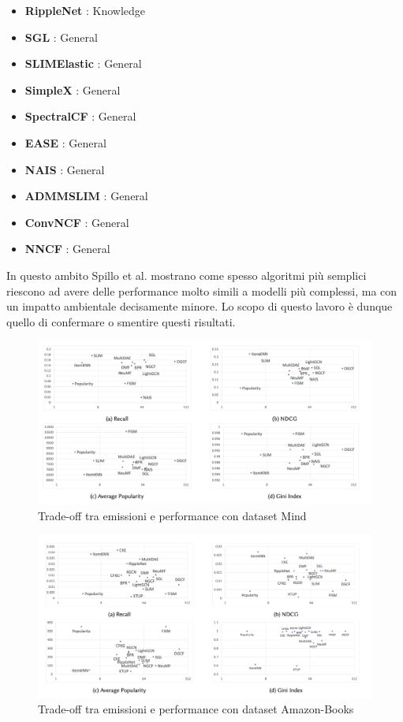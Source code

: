 \begin{itemize}
    \item \textbf{RippleNet} \cite{RippleNet}: Knowledge
    \item \textbf{SGL} \cite{SGL}: General
    \item \textbf{SLIMElastic} \cite{SLIMElastic}: General
    \item \textbf{SimpleX} \cite{SimpleX}: General
    \item \textbf{SpectralCF} \cite{SpectralCF}: General
    \item \textbf{EASE} \cite{EASE}: General
    \item \textbf{NAIS} \cite{NAIS}: General
    \item \textbf{ADMMSLIM} \cite{ADMMSLIM}: General
    \item \textbf{ConvNCF} \cite{ConvNCF}: General
    \item \textbf{NNCF} \cite{NNCF}: General
\end{itemize}

\noindent In questo ambito  Spillo et al.\cite{spillo2023towards} mostrano come spesso algoritmi più semplici riescono ad avere delle performance molto simili a modelli più complessi, ma con un impatto ambientale decisamente minore. Lo scopo di questo lavoro è dunque quello di confermare o smentire questi risultati.\\
\begin{figure}[H]
    \centering
    \includegraphics[width=\textwidth]{images/sum_mind_dataset.png}
    \caption{Trade-off tra emissioni e performance con dataset Mind}
\end{figure}
\begin{figure}[H]
    \centering
    \includegraphics[width=\textwidth]{images/sum_amazon_books_dataset.png}
    \caption{Trade-off tra emissioni e performance con dataset Amazon-Books}
\end{figure}

